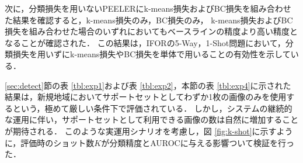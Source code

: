 \documentclass[a4paper,11pt,nomag]{jsreport}
\begin{document}
次に，分類損失を用いないPEELERにk-means損失およびBC損失を組み合わせた結果を確認すると，k-means損失のみ，BC損失のみ，
k-means損失およびBC損失を組み合わせた場合のいずれにおいてもベースラインの精度より高い精度となることが確認された．
この結果は，IFORの5-Way，1-Shot問題において，分類損失を用いずにk-means損失やBC損失を単体で用いることの有効性を示している．


\ref{sec:detect}節の表 \ref{tbl:exp1}および表 \ref{tbl:exp2}，本節の表 \ref{tbl:exp4}に示された結果は，新規地域においてサポートセットとしてわずか1枚の画像のみを使用するという，極めて厳しい条件下で評価されている．
しかし，システムの継続的な運用に伴い，サポートセットとして利用できる画像の数は自然に増加することが期待される．
このような実運用シナリオを考慮し，図 \ref{fig:k-shot}に示すように，評価時のショット数$K$が分類精度とAUROCに与える影響ついて検証を行った．
% 
\end{document}
